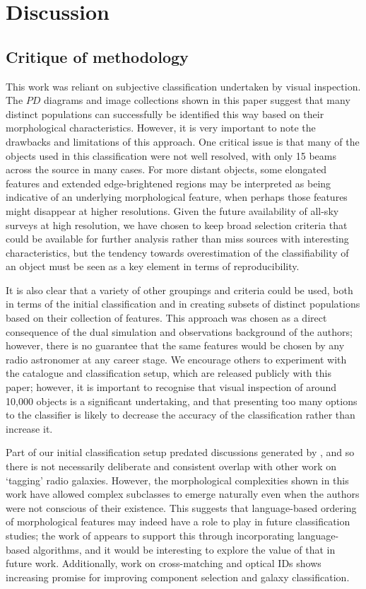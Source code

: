 \documentclass{aa}
\begin{document}
\section{Discussion}
\subsection{Critique of methodology}
This work was reliant on subjective classification undertaken by visual inspection. The $PD$ diagrams and image collections shown in this paper suggest that many distinct populations can successfully be identified this way based on their morphological characteristics. However, it is very important to note the drawbacks and limitations of this approach. One critical issue is that many of the objects used in this classification were not well resolved, with only 15 beams across the source in many cases. For more distant objects, some elongated features and extended edge-brightened regions may be interpreted as being indicative of an underlying morphological feature, when perhaps those features might disappear at higher resolutions. Given the future availability of all-sky surveys at high resolution, we have chosen to keep broad selection criteria that could be available for further analysis rather than miss sources with interesting characteristics, but the tendency towards overestimation of the classifiability of an object must be seen as a key element in terms of reproducibility. 

It is also clear that a variety of other groupings and criteria could be used, both in terms of the initial classification and in creating subsets of distinct populations based on their collection of features. This approach was chosen as a direct consequence of the dual simulation and observations background of the authors; however, there is no guarantee that the same features would be chosen by any radio astronomer at any career stage. We encourage others to experiment with the catalogue and classification setup, which are released publicly with this paper; however, it is important to recognise that visual inspection of around 10,000 objects is a significant undertaking, and that presenting too many options to the classifier is likely to decrease the accuracy of the classification rather than increase it. 

Part of our initial classification setup predated discussions generated by \cite{rudnick21}, and so there is not necessarily deliberate and consistent overlap with other work on `tagging' radio galaxies. However, the morphological complexities shown in this work have allowed complex subclasses to emerge naturally even when the authors were not conscious of their existence. This suggests that language-based ordering of morphological features may indeed have a role to play in future classification studies; the work of \cite{bowles23} appears to support this through incorporating language-based algorithms, and it would be interesting to explore the value of that in future work. Additionally, work on cross-matching and optical IDs \citep{hardcastle23,mostert24,alegre24} shows increasing promise for improving component selection and galaxy classification.
\end{document}

